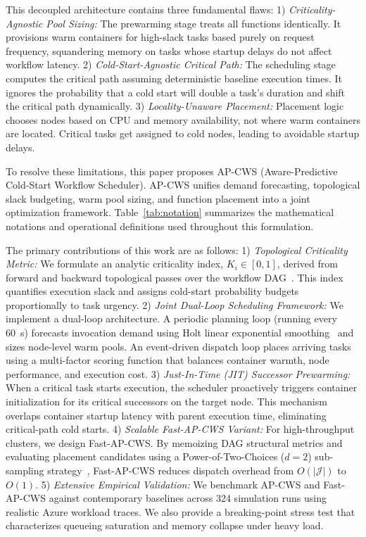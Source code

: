 \documentclass[conference]{IEEEtran}
\begin{document}
This decoupled architecture contains three fundamental flaws:
1) \textit{Criticality-Agnostic Pool Sizing:} The prewarming stage treats all functions identically. It provisions warm containers for high-slack tasks based purely on request frequency, squandering memory on tasks whose startup delays do not affect workflow latency.
2) \textit{Cold-Start-Agnostic Critical Path:} The scheduling stage computes the critical path assuming deterministic baseline execution times. It ignores the probability that a cold start will double a task's duration and shift the critical path dynamically.
3) \textit{Locality-Unaware Placement:} Placement logic chooses nodes based on CPU and memory availability, not where warm containers are located. Critical tasks get assigned to cold nodes, leading to avoidable startup delays.

To resolve these limitations, this paper proposes AP-CWS (Aware-Predictive Cold-Start Workflow Scheduler). AP-CWS unifies demand forecasting, topological slack budgeting, warm pool sizing, and function placement into a joint optimization framework. Table~\ref{tab:notation} summarizes the mathematical notations and operational definitions used throughout this formulation.

The primary contributions of this work are as follows:
1) \textit{Topological Criticality Metric:} We formulate an analytic criticality index, $K_i \in [0, 1]$, derived from forward and backward topological passes over the workflow DAG~\cite{topcuoglu2002heft}. This index quantifies execution slack and assigns cold-start probability budgets proportionally to task urgency.
2) \textit{Joint Dual-Loop Scheduling Framework:} We implement a dual-loop architecture. A periodic planning loop (running every 60~s) forecasts invocation demand using Holt linear exponential smoothing~\cite{holt2004forecasting} and sizes node-level warm pools. An event-driven dispatch loop places arriving tasks using a multi-factor scoring function that balances container warmth, node performance, and execution cost.
3) \textit{Just-In-Time (JIT) Successor Prewarming:} When a critical task starts execution, the scheduler proactively triggers container initialization for its critical successors on the target node. This mechanism overlaps container startup latency with parent execution time, eliminating critical-path cold starts.
4) \textit{Scalable Fast-AP-CWS Variant:} For high-throughput clusters, we design Fast-AP-CWS. By memoizing DAG structural metrics and evaluating placement candidates using a Power-of-Two-Choices ($d=2$) sub-sampling strategy~\cite{mitzenmacher2001power}, Fast-AP-CWS reduces dispatch overhead from $O(|\mathcal{J}|)$ to $O(1)$.
5) \textit{Extensive Empirical Validation:} We benchmark AP-CWS and Fast-AP-CWS against contemporary baselines across 324 simulation runs using realistic Azure workload traces. We also provide a breaking-point stress test that characterizes queueing saturation and memory collapse under heavy load.
\end{document}
